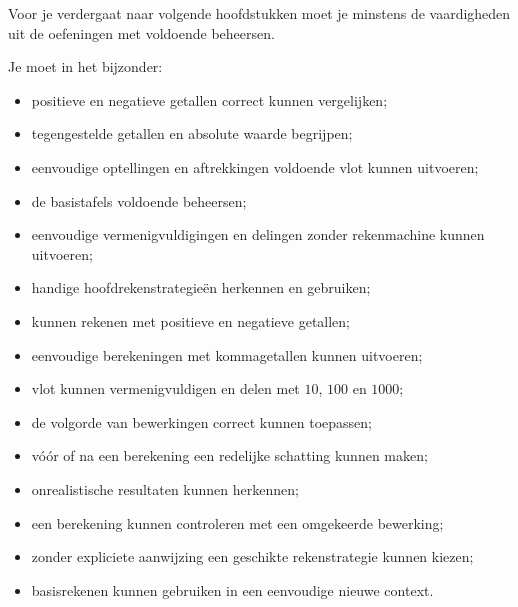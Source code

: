 \documentclass{ximera}
\begin{document}
\begin{opmerking}

Voor je verdergaat naar volgende hoofdstukken moet je minstens de
vaardigheden uit de oefeningen met \ESS voldoende beheersen.

Je moet in het bijzonder:

\begin{itemize}

    \item positieve en negatieve getallen correct kunnen vergelijken;

    \item tegengestelde getallen en absolute waarde begrijpen;

    \item eenvoudige optellingen en aftrekkingen voldoende vlot kunnen uitvoeren;

    \item de basistafels voldoende beheersen;

    \item eenvoudige vermenigvuldigingen en delingen zonder rekenmachine kunnen uitvoeren;

    \item handige hoofdrekenstrategieën herkennen en gebruiken;

    \item kunnen rekenen met positieve en negatieve getallen;

    \item eenvoudige berekeningen met kommagetallen kunnen uitvoeren;

    \item vlot kunnen vermenigvuldigen en delen met \(10\), \(100\) en \(1000\);

    \item de volgorde van bewerkingen correct kunnen toepassen;

    \item vóór of na een berekening een redelijke schatting kunnen maken;

    \item onrealistische resultaten kunnen herkennen;

    \item een berekening kunnen controleren met een omgekeerde bewerking;

    \item zonder expliciete aanwijzing een geschikte rekenstrategie kunnen kiezen;

    \item basisrekenen kunnen gebruiken in een eenvoudige nieuwe context.


\end{itemize}
\end{opmerking}
\end{document}
